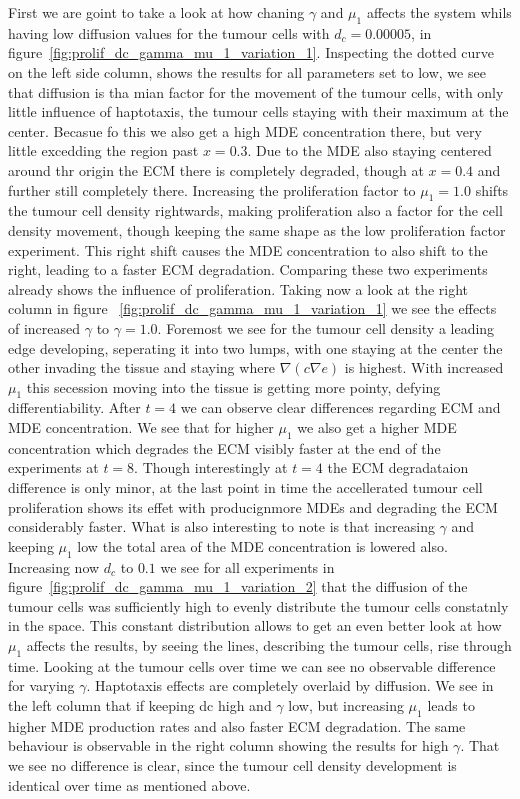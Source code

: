 First we are goint to take a look at how chaning $\gamma$ and $\mu_1$ affects the system whils having low diffusion values for the tumour cells with $d_c=0.00005$, in figure~\ref{fig:prolif_dc_gamma_mu_1_variation_1}. Inspecting the dotted curve on the left side column, shows the results for all parameters set to low, we see that diffusion is tha mian factor for the movement of the tumour cells, with only little influence of haptotaxis, the tumour cells staying with their maximum at the center. Becasue fo this we also get a high MDE concentration there, but very little excedding the region past $x=0.3$. Due to the MDE also staying centered around thr origin the ECM there is completely degraded, though at $x=0.4$ and further still completely there. Increasing the proliferation factor to $\mu_1=1.0$ shifts the tumour cell density rightwards, making proliferation also a factor for the cell density movement, though keeping the same shape as the low proliferation factor experiment. This right shift causes the MDE concentration to also shift to the right, leading to a faster ECM degradation. Comparing these two experiments already shows the influence of proliferation.\newline
Taking now a look at the right column in figure ~\ref{fig:prolif_dc_gamma_mu_1_variation_1} we see the effects of increased $\gamma$ to $\gamma=1.0$. Foremost we see for the tumour cell density a leading edge developing, seperating it into two lumps, with one staying at the center the other invading the tissue and staying where $\nabla (c \nabla e)$ is highest. With increased $\mu_1$ this secession moving into the tissue is getting more pointy, defying differentiability. After $t=4$ we can observe clear differences regarding ECM and MDE concentration. We see that for higher $\mu_1$ we also get a higher MDE concentration which degrades the ECM visibly faster at the end of the experiments at $t=8$. Though interestingly at $t=4$ the ECM degradataion difference is only minor, at the last point in time the accellerated tumour cell proliferation shows its effet with producignmore MDEs and degrading the ECM considerably faster. What is also interesting to note is that increasing $\gamma$ and keeping $\mu_1$ low the total area of the MDE concentration is lowered also.
Increasing now $d_c$ to $0.1$ we see for all experiments in figure~\ref{fig:prolif_dc_gamma_mu_1_variation_2} that the diffusion of the tumour cells was sufficiently high to evenly distribute the tumour cells constatnly in the space. This constant distribution allows to get an even better look at how $\mu_1$ affects the results, by seeing the lines, describing the tumour cells, rise through time. Looking at the tumour cells over time we can see no observable difference for varying $\gamma$. Haptotaxis effects are completely overlaid by diffusion. We see in the left column that if keeping dc high and $\gamma$ low, but increasing $\mu_1$ leads to higher MDE production rates and also faster ECM degradation. The same behaviour is observable in the right column showing the results for high $\gamma$. That we see no difference is clear, since the tumour cell density development is identical over time as mentioned above. 



